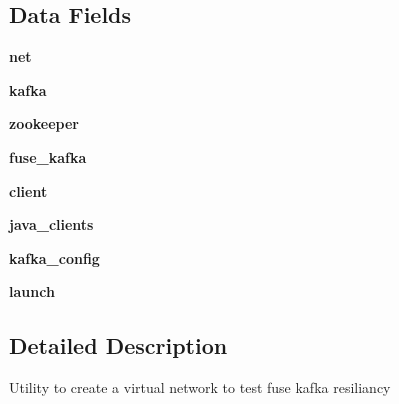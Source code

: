 \subsection*{\-Data \-Fields}
\begin{DoxyCompactItemize}
\item 
\hypertarget{classbuild_1_1TestMininet_af25a115402073806776bb044166582c5}{{\bfseries net}}\label{classbuild_1_1TestMininet_af25a115402073806776bb044166582c5}

\item 
\hypertarget{classbuild_1_1TestMininet_a19fdf32f6e4a5c549ecdfd8d10154c9e}{{\bfseries kafka}}\label{classbuild_1_1TestMininet_a19fdf32f6e4a5c549ecdfd8d10154c9e}

\item 
\hypertarget{classbuild_1_1TestMininet_aa22f4195bb2ba1e4f566fd0d0dd68644}{{\bfseries zookeeper}}\label{classbuild_1_1TestMininet_aa22f4195bb2ba1e4f566fd0d0dd68644}

\item 
\hypertarget{classbuild_1_1TestMininet_aad28b00ed30aa22a2fd5aa10acddb01f}{{\bfseries fuse\-\_\-kafka}}\label{classbuild_1_1TestMininet_aad28b00ed30aa22a2fd5aa10acddb01f}

\item 
\hypertarget{classbuild_1_1TestMininet_ae4493ea1ec4b060509916390a2e3787b}{{\bfseries client}}\label{classbuild_1_1TestMininet_ae4493ea1ec4b060509916390a2e3787b}

\item 
\hypertarget{classbuild_1_1TestMininet_a3f2a95206e01e7d4c096df1366cabab9}{{\bfseries java\-\_\-clients}}\label{classbuild_1_1TestMininet_a3f2a95206e01e7d4c096df1366cabab9}

\item 
\hypertarget{classbuild_1_1TestMininet_af204dd0350ebd9e7852ab138ebfc4ff8}{{\bfseries kafka\-\_\-config}}\label{classbuild_1_1TestMininet_af204dd0350ebd9e7852ab138ebfc4ff8}

\item 
\hypertarget{classbuild_1_1TestMininet_a0409fdeedd0876acc047a7df996676dc}{{\bfseries launch}}\label{classbuild_1_1TestMininet_a0409fdeedd0876acc047a7df996676dc}

\end{DoxyCompactItemize}


\subsection{\-Detailed \-Description}
\begin{DoxyVerb}Utility to create a virtual network to test fuse kafka resiliancy \end{DoxyVerb}
 

